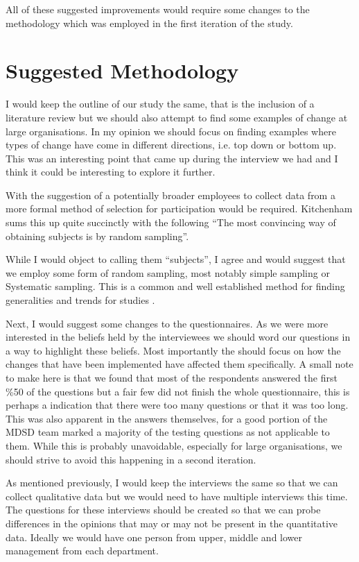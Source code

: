\documentclass[conference]{IEEEtran}
\begin{document}
All of these suggested improvements would require some changes to the methodology which was employed in the first iteration of the study.

\section{Suggested Methodology}

I would keep the outline of our study the same, that is the inclusion of a
literature review but we should also attempt to find some examples of change at large organisations. In my opinion we should focus on finding examples where types of change have come in different directions, i.e. top down or bottom up. This was an interesting point that came up during the interview we had and I think it could be interesting to explore it further.

With the suggestion of a potentially broader employees to collect data from a more formal method of selection for participation would be required. Kitchenham sums this up quite succinctly with the following ``The most convincing way of obtaining subjects is by random sampling''\cite{kitchenham2003principles}.

While I would object to calling them ``subjects'', I agree and would suggest that we employ some form of random sampling, most notably simple sampling or Systematic sampling. This is a common and well established method for finding generalities and trends for studies \cite{kitchenham2003principles}.

Next, I would suggest some changes to the questionnaires. As we were more interested in the beliefs held by the interviewees we should word our questions in a way to highlight these beliefs. Most importantly the should focus on how the changes that have been implemented have affected them specifically. A small note to make here is that we found that most of the respondents answered the first \%50 of the questions but a fair few did not finish the whole questionnaire, this is perhaps a indication that there were too many questions or that it was too long. This was also apparent in the answers themselves, for a good portion of the MDSD team marked a majority of the testing questions as not applicable to them. While this is probably unavoidable, especially for large organisations, we should strive to avoid this happening in a second iteration.

As mentioned previously, I would keep the interviews the same so that we can collect qualitative data but we would need to have multiple interviews this time. The questions for these interviews should be created so that we can probe differences in the opinions that may or may not be present in the quantitative data. Ideally we would have one person from upper, middle and lower management from each department.
\end{document}
